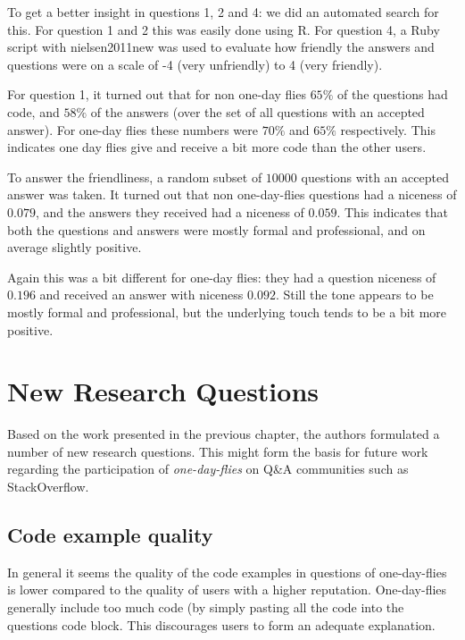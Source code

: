 \documentclass[conference]{IEEEtran}
\begin{document}
To get a better insight in questions 1, 2 and 4: we did an automated search for this. For question 1 and 2 this was easily done using R. For question 4, a Ruby script with nielsen2011new \cite{nielsen2011new} was used to evaluate how friendly the answers and questions were on a scale of -4 (very unfriendly) to 4 (very friendly). 

For question 1, it turned out that for non one-day flies $65\%$ of the questions had code, and $58\%$ of the answers (over the set of all questions with an accepted answer). For one-day flies these numbers were $70\%$ and $65\%$ respectively. This indicates one day flies give and receive a bit more code than the other users.

To answer the friendliness, a random subset of $10000$ questions with an accepted answer was taken. It turned out that non one-day-flies questions had a niceness of $0.079$, and the answers they received had a niceness of $0.059$. This indicates that both the questions and answers were mostly formal and professional, and on average slightly positive.

Again this was a bit different for one-day flies: they had a question niceness of $0.196$ and received an answer with niceness $0.092$. Still the tone appears to be mostly formal and professional, but the underlying touch tends to be a bit more positive.

\section{New Research Questions} \label{NewResearchQuestions}

Based on the work presented in the previous chapter, the authors formulated a number of new research questions. This might form the basis for future work regarding the participation of \textit{one-day-flies} on Q\&A communities such as StackOverflow.

\subsection{Code example quality}

In general it seems the quality of the code examples in questions of one-day-flies is lower compared to the quality of users with a higher reputation. One-day-flies generally include too much code (by simply pasting all the code into the questions code block. This discourages users to form an adequate explanation.
\end{document}
